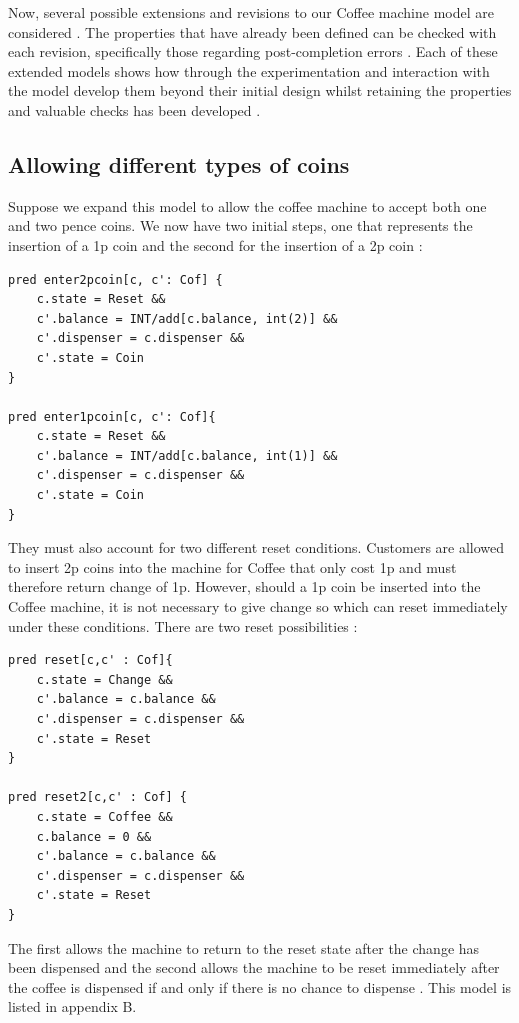\documentclass[a4paper,10pt]{report}
\begin{document}
Now, several possible extensions and revisions to our Coffee machine model are considered \cite{Boyatt}. The properties that have already been defined can be checked with each revision, specifically those regarding post-completion errors \cite{Boyatt}. Each of these extended models shows how through the experimentation and interaction with the model develop them beyond their initial design whilst retaining the properties and valuable checks has been developed \cite{Boyatt}.

\subsection{Allowing different types of coins}
\label{Allowing different types coins}

Suppose we expand this model to allow the coffee machine to accept both one and two pence coins. We now have two initial steps, one that represents the insertion of a 1p coin and the second for the insertion of a 2p coin \cite{Boyatt}:

\begin{verbatim}
pred enter2pcoin[c, c': Cof] {
	c.state = Reset &&
	c'.balance = INT/add[c.balance, int(2)] &&
	c'.dispenser = c.dispenser &&
	c'.state = Coin
}

pred enter1pcoin[c, c': Cof]{
	c.state = Reset &&
	c'.balance = INT/add[c.balance, int(1)] &&
	c'.dispenser = c.dispenser &&
	c'.state = Coin
}
\end{verbatim}
They must also account for two different reset conditions. Customers are allowed to insert 2p coins into the machine for Coffee that only cost 1p and must therefore return change of 1p. However, should a 1p coin be inserted into the Coffee machine, it is not necessary to give change so which can reset immediately under these conditions. There are two reset possibilities \cite{Boyatt}:

\begin{verbatim}
pred reset[c,c' : Cof]{
	c.state = Change &&
	c'.balance = c.balance &&
	c'.dispenser = c.dispenser &&
	c'.state = Reset
}

pred reset2[c,c' : Cof] {
	c.state = Coffee &&
	c.balance = 0 &&
	c'.balance = c.balance &&
	c'.dispenser = c.dispenser &&
	c'.state = Reset
}
\end{verbatim}

The first allows the machine to return to the reset state after the change has been dispensed and the second allows the machine to be reset immediately after the coffee is dispensed if and only if there is no chance to dispense \cite{Boyatt}. This model is listed in appendix B.
\end{document}
